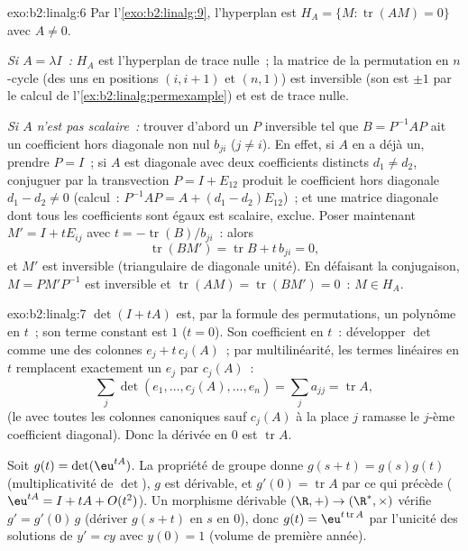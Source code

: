 \begin{solution}{exo:b2:linalg:6}
Par l'\cref{exo:b2:linalg:9}, l'hyperplan est $H_A = \{M :
\operatorname{tr}(AM) = 0\}$ avec $A \neq 0$.

\emph{Si $A = \lambda I$~:} $H_A$ est l'hyperplan de trace nulle~; la
matrice de la permutation en $n$-cycle (des uns en positions $(i, i+1)$
et $(n, 1)$) est inversible (son  est $\pm 1$ par
le calcul de l'\cref{ex:b2:linalg:permexample}) et est de trace nulle.

\emph{Si $A$ n'est pas scalaire~:} trouver d'abord un $P$ inversible tel que
$B = P^{-1}AP$ ait un coefficient hors diagonale non nul $b_{ji}$ ($j \neq
i$). En effet, si $A$ en a déjà un, prendre $P = I$~; si $A$ est
diagonale avec deux coefficients distincts $d_1 \neq d_2$, conjuguer par
la transvection $P = I + E_{12}$ produit le coefficient hors diagonale
$d_1 - d_2 \neq 0$ (calcul~: $P^{-1}AP = A + (d_1 - d_2)E_{12}$)~;
et une matrice diagonale dont tous les coefficients sont égaux est
scalaire, exclue. Poser maintenant $M' = I + tE_{ij}$ avec $t =
-\operatorname{tr}(B)/b_{ji}$~: alors
\[
\operatorname{tr}(BM') = \operatorname{tr} B + t\,b_{ji} = 0,
\]
et $M'$ est inversible (triangulaire de diagonale unité). En défaisant
la conjugaison, $M = PM'P^{-1}$ est inversible et
$\operatorname{tr}(AM) = \operatorname{tr}(BM') = 0$~: $M \in H_A$.
\end{solution}

\begin{solution}{exo:b2:linalg:7}
$\det(I + tA)$ est, par la formule des permutations, un polynôme en $t$~;
son terme constant est $1$ ($t = 0$). Son coefficient en $t$~: développer
$\det$ comme une  des colonnes $e_j + t\,c_j(A)$~; par
multilinéarité, les termes linéaires en $t$ remplacent exactement un $e_j$ par
$c_j(A)$~:
\[
\sum_{j} \det(e_1, \dots, c_j(A), \dots, e_n)
= \sum_j a_{jj} = \operatorname{tr} A ,
\]
(le  avec toutes les colonnes canoniques sauf $c_j(A)$ à la
place $j$ ramasse le $j$-ème coefficient diagonal). Donc la dérivée en $0$
est $\operatorname{tr} A$.

Soit $g(t) = \det(\eu^{tA})$. La propriété de groupe donne $g(s + t) =
g(s)g(t)$ (multiplicativité de $\det$), $g$ est dérivable, et
$g'(0) = \operatorname{tr} A$ par ce qui précède ($\eu^{tA} = I + tA +
O(t^2)$). Un morphisme dérivable $(\R, +) \to (\R^*, \times)$
vérifie $g' = g'(0)\,g$ (dériver $g(s+t)$ en $s$ en $0$), donc
$g(t) = \eu^{t\operatorname{tr} A}$ par l'unicité des solutions
de $y' = cy$ avec $y(0) = 1$ (volume de première année).
\end{solution}

